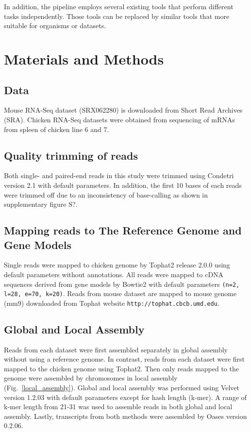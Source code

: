 \documentclass[10pt]{article}
\begin{document}
In addition, the pipeline employs several existing tools that perform different tasks independently.
Those tools can be replaced by similar tools that more suitable for organisms or datasets.

\section*{Materials and Methods}

\subsection*{Data}
Mouse RNA-Seq dataset (SRX062280) is downloaded from Short Read Archives (SRA).
Chicken RNA-Seq datasets were obtained from sequencing of mRNAs from spleen of chicken line 6 and 7.

\subsection*{Quality trimming of reads}
Both single- and paired-end reads in this study were trimmed using Condetri version 2.1 with default parameters.
In addition, the first 10 bases of each reads were trimmed off due to an inconsistency of base-calling as shown in supplementary figure S?.

\subsection*{Mapping reads to The Reference Genome and Gene Models}

Single reads were mapped to chicken genome by Tophat2\cite{Trapnell:2009dp} release 2.0.0 using default parameters without annotations.
All reads were mapped to cDNA sequences derived from gene models by Bowtie2\cite{Langmead:2009fv} with
default parameters \texttt{(n=2, l=28, e=70, k=20)}.
Reads from mouse dataset are mapped to mouse genome (mm9) downloaded from Tophat website \texttt{http://tophat.cbcb.umd.edu}.

\subsection*{Global and Local Assembly}

Reads from each dataset were first assembled separately in global assembly without using a reference genome.
In contrast, reads from each dataset were first mapped to the chicken genome using Tophat2.
Then only reads mapped to the genome were assembled by chromosomes in local assembly (Fig.~\ref{local_assembly}).
Global and local assembly was performed using Velvet version 1.2.03\cite{Zerbino:2008vu}
with default parameters except for hash length (k-mer).
A range of k-mer length from 21-31 was used to assemble reads in both global and local assembly.
Lastly, transcripts from both methods were assembled by Oases version 0.2.06\cite{Schulz:2012je}.
\end{document}
